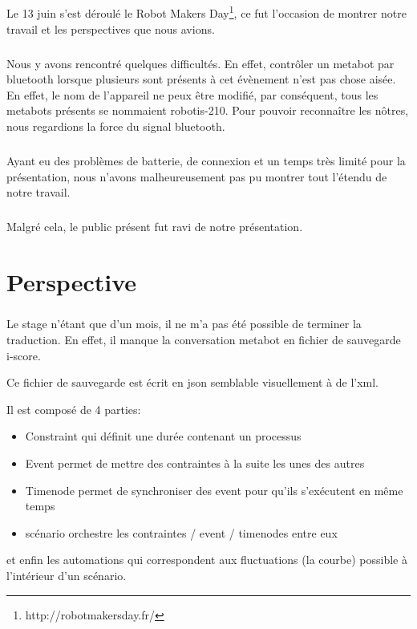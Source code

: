 \documentclass[10pt,a4paper]{report}
\begin{document}
\paragraph{}
Le 13 juin s'est déroulé le Robot Makers Day\footnote{http://robotmakersday.fr/}, ce fut l'occasion de montrer notre travail et les perspectives que nous avions.
\paragraph{}
Nous y avons rencontré quelques difficultés. En effet, contrôler un metabot par bluetooth lorsque plusieurs sont présents à cet évènement n'est pas chose aisée. En effet, le nom de l'appareil ne peux être modifié, par conséquent, tous les metabots présents se nommaient robotis-210. Pour pouvoir reconnaître les nôtres, nous regardions la force du signal bluetooth.
\paragraph{}
Ayant eu des problèmes de batterie, de connexion et un temps très limité pour la présentation, nous n'avons malheureusement pas pu montrer tout l'étendu de notre travail.
\paragraph{}
Malgré cela, le public présent fut ravi de notre présentation.

\paragraph{}
\chapter{Perspective}
\paragraph{}
Le stage n'étant que d'un mois, il ne m'a pas été possible de terminer la traduction. En effet, il manque la conversation metabot en fichier de sauvegarde i-score.

Ce fichier de sauvegarde est écrit en \acrfull{json} semblable visuellement à de l'xml.

Il est composé de 4 parties:
\begin{itemize}
\item Constraint qui définit une durée contenant un processus
\item Event permet de mettre des contraintes à la suite les unes des autres
\item Timenode permet de synchroniser des event pour qu'ils s'exécutent en même temps
\item scénario orchestre les contraintes / event / timenodes entre eux
\end{itemize}
et enfin les automations qui correspondent aux fluctuations (la courbe) possible à l'intérieur d'un scénario.
\end{document}
